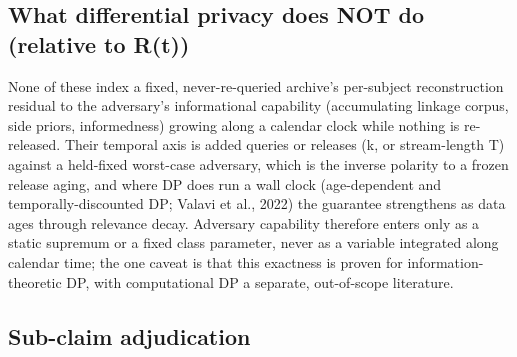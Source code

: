 \documentclass[
  11pt,
]{article}
\begin{document}
\subsection{What differential privacy does NOT do (relative to
R(t))}\label{what-differential-privacy-does-not-do-relative-to-rt}

None of these index a fixed, never-re-queried archive's per-subject
reconstruction residual to the adversary's informational capability
(accumulating linkage corpus, side priors, informedness) growing along a
calendar clock while nothing is re-released. Their temporal axis is
added queries or releases (k, or stream-length T) against a held-fixed
worst-case adversary, which is the inverse polarity to a frozen release
aging, and where DP does run a wall clock (age-dependent and
temporally-discounted DP; Valavi et al., 2022) the guarantee strengthens
as data ages through relevance decay. Adversary capability therefore
enters only as a static supremum or a fixed class parameter, never as a
variable integrated along calendar time; the one caveat is that this
exactness is proven for information-theoretic DP, with computational DP
a separate, out-of-scope literature.

\subsection{Sub-claim adjudication}\label{sub-claim-adjudication}
\end{document}
